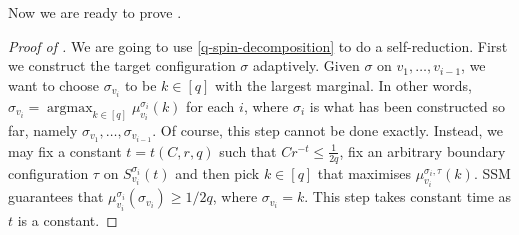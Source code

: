 \documentclass[11pt]{amsart}
\theoremstyle{definition}
\theoremstyle{remark}
\newcommand{\argmax}{\operatorname{argmax}}
\begin{document}
Now we are ready to prove . 

\begin{proof}[Proof of ]
  We are going to use \eqref{q-spin-decomposition} to do a self-reduction.
  First we construct the target configuration $\sigma$ adaptively.
  Given $\sigma$ on $v_1,\ldots,v_{i-1}$,
  we want to choose $\sigma_{v_i}$ to be $k\in [q]$ with the largest marginal.
  In other words, $\sigma_{v_i}=\argmax_{k\in[q]}\mu_{v_i}^{\sigma_i}(k)$ for each $i$,
  where $\sigma_i$ is what has been constructed so far, namely $\sigma_{v_1},\ldots,\sigma_{v_{i-1}}$.
  Of course, this step cannot be done exactly.
  Instead, we may fix a constant $t = t(C,r,q)$ such that $Cr^{-t} \leq \frac{1}{2q}$, fix an arbitrary boundary  configuration $\tau$ on $S^{\sigma_i}_{v_i}(t)$ and then pick $k\in[q]$ that maximises $\mu^{\sigma_i,\tau}_{v_i}(k)$.
  SSM guarantees that
  $\mu_{v_i}^{\sigma_i}(\sigma_{v_i})\ge 1/2q$, where $\sigma_{v_i} = k$.
  This step takes constant time as $t$ is a constant.


\end{proof}
\end{document}
